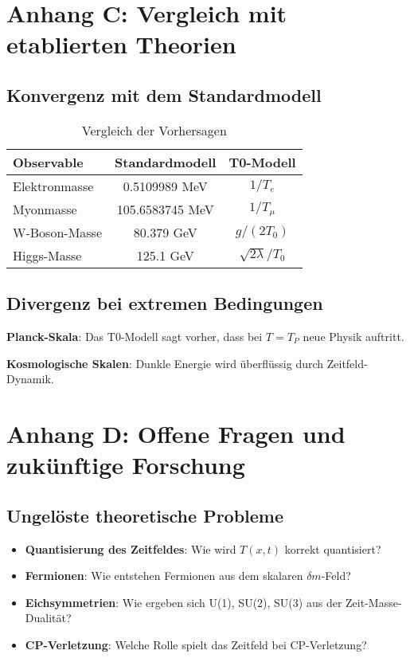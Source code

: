 \documentclass[12pt,a4paper]{report}
\begin{document}
	\section{Anhang C: Vergleich mit etablierten Theorien}
	
	\subsection{Konvergenz mit dem Standardmodell}
	
	\begin{table}[htbp]
		\centering
		\begin{tabular}{lcc}
			\toprule
			\textbf{Observable} & \textbf{Standardmodell} & \textbf{T0-Modell} \\
			\midrule
			Elektronmasse & 0.5109989 MeV & $1/T_e$ \\
			Myonmasse & 105.6583745 MeV & $1/T_\mu$ \\
			W-Boson-Masse & 80.379 GeV & $g/(2T_0)$ \\
			Higgs-Masse & 125.1 GeV & $\sqrt{2\lambda}/T_0$ \\
			\bottomrule
		\end{tabular}
		\caption{Vergleich der Vorhersagen}
	\end{table}
	
	\subsection{Divergenz bei extremen Bedingungen}
	
	\textbf{Planck-Skala}: Das T0-Modell sagt vorher, dass bei $T = T_P$ neue Physik auftritt.
	
	\textbf{Kosmologische Skalen}: Dunkle Energie wird überflüssig durch Zeitfeld-Dynamik.
	
	\section{Anhang D: Offene Fragen und zukünftige Forschung}
	
	\subsection{Ungelöste theoretische Probleme}
	
	\begin{itemize}
		\item \textbf{Quantisierung des Zeitfeldes}: Wie wird $T(x,t)$ korrekt quantisiert?
		\item \textbf{Fermionen}: Wie entstehen Fermionen aus dem skalaren $\delta m$-Feld?
		\item \textbf{Eichsymmetrien}: Wie ergeben sich U(1), SU(2), SU(3) aus der Zeit-Masse-Dualität?
		\item \textbf{CP-Verletzung}: Welche Rolle spielt das Zeitfeld bei CP-Verletzung?
	\end{itemize}
	
\end{document}
